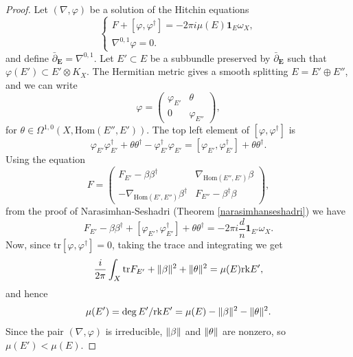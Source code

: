 \documentclass[12pt,a4paper]{book}
\theoremstyle{definition} \newtheorem{defn}[thm]{Definition}
\theoremstyle{definition} \newtheorem{ejemplo}[thm]{Example}
\theoremstyle{remark} \newtheorem{rem}[thm]{Remark}
\def\tr{\mathrm{tr}}
\def\rk{\mathrm{rk}}
\def\id{\mathbf{1}}
\def\Hom{\mathrm{Hom}}
\def\delbar{\bar{\partial}}
\newcommand{\ve}[1]{\mathbf{#1}}
\DeclarePairedDelimiter\norm{\lVert}{\rVert}
\begin{document}
	  \begin{proof}
	    Let $(\nabla,\varphi)$ be a solution of the Hitchin equations
	  \begin{equation*}
	    \begin{cases}
	      F+[\varphi,\varphi^\dagger]=-2\pi i \mu(E) \id_E \omega_X, \\
	      \nabla^{0,1}\varphi=0.
	    \end{cases}
	  \end{equation*}
	  and define $\delbar_{\ve{E}}=\nabla^{0,1}$. Let $E'\subset E$ be a subbundle preserved by $\delbar_{\ve{E}}$ such that $\varphi(E')\subset E'\otimes K_X$. The Hermitian metric gives a smooth splitting $E=E'\oplus E''$, and we can write
	  \begin{equation*}
	    \varphi=
	    \left(
	    \begin{array}{cc}
	      \varphi_{E'} & \theta \\
	      0 & \varphi_{E''}
	    \end{array}
	    \right),
	  \end{equation*}
	  for $\theta \in \Omega^{1,0}(X,\Hom(E'',E'))$.
	  The top left element of $[\varphi,\varphi^\dagger]$ is
	  \begin{equation*}
	    \varphi_{E'}\varphi_{E'}^\dagger + \theta\theta^\dagger - \varphi_{E'}^\dagger\varphi_{E'}=[\varphi_{E'},\varphi_{E'}^\dagger] + \theta  \theta^\dagger.
	  \end{equation*}
	  Using the equation
	  \begin{equation*}
  F=\left(
  \begin{array}{cc}
    F_{E'}-\beta\beta^\dagger & \nabla_{\Hom(E'',E')}\beta \\
    -\nabla_{\Hom (E',E'')}\beta^\dagger & F_{E''}-\beta^\dagger \beta
  \end{array}\right),
	  \end{equation*}
	  from the proof of Narasimhan-Seshadri (Theorem \ref{narasimhanseshadri}) we have
	  \begin{equation*}
	    F_{E'}-\beta \beta^{\dagger} + [\varphi_{E'},\varphi_{E'}^\dagger]+\theta \theta^{\dagger}=-2\pi i \frac{d}{n}\id_{E'} \omega_X.
	  \end{equation*}
	  Now, since $\tr[\varphi,\varphi^\dagger]=0$, taking the trace and integrating we get
	  \begin{equation*}
	    \frac{i}{2\pi}\int_X \tr F_{E'} + \norm{\beta}^2 + \norm{\theta}^2  = \mu(E) \rk E',
	  \end{equation*}
	  and hence
	  \begin{equation*}
	   \mu(E')= \deg E'/\rk E'= \mu(E)-\norm{\beta}^2 - \norm{\theta}^2.
	  \end{equation*}
	  Since the pair $(\nabla,\varphi)$ is irreducible, $\norm{\beta}$ and $\norm{\theta}$ are nonzero, so $\mu(E')<\mu(E)$.
	  \end{proof}
\end{document}
